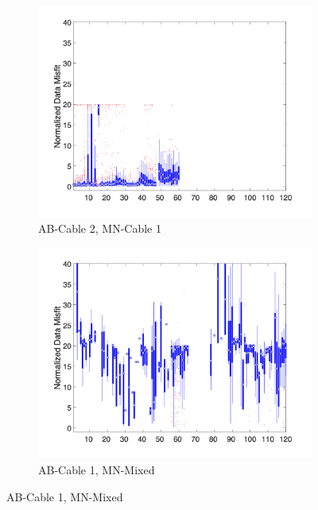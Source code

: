 \documentclass[final,authoryear,5p,times,twocolumn]{elsarticle}
\begin{document}
\begin{figure}[!ht]
   \vspace{1em}

   \begin{subfigure}[b]{0.475\linewidth}
       \centering
       \includegraphics[trim=1.6cm 1.7cm 2cm 1.3cm, clip=true, width=\linewidth]{./Figures/Fig8e.png}
       \caption{AB-Cable 2, MN-Cable 1}
       \label{fig:Boxplot_AB_Cable2_MN_Cable1_Misfit_vs_M_ElecID}
   \end{subfigure}
   \hfill
   \begin{subfigure}[b]{0.475\linewidth}
       \centering
       \includegraphics[trim=1.6cm 1.7cm 2cm 1.3cm, clip=true, width=\linewidth]{./Figures/Fig8f.png}
       \caption{AB-Cable 1, MN-Mixed}
       \label{fig:Boxplot_AB_Cable1_MN_Mixed_Misfit_vs_M_ElecID}
   \end{subfigure}


\end{figure}
\end{document}
